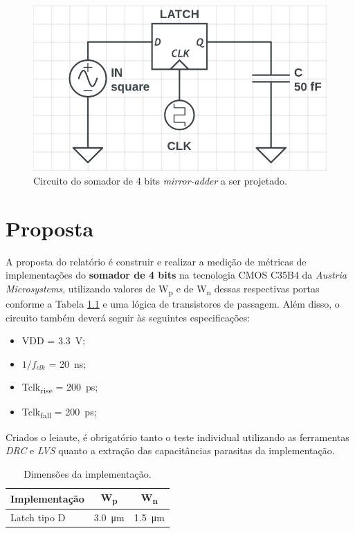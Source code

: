 \documentclass{iiufrgs}
\begin{document}
\begin{figure}[htb]
    \centering
    \caption{Circuito do somador de 4 bits \textit{mirror-adder} a ser projetado.}
    \label{fig:somador1bit}
    \includegraphics[scale=0.5]{images/schem_pretty.png}
\end{figure}

\chapter{Proposta}\label{proposta}
A proposta do relatório é construir e realizar a medição de métricas de implementações do \textbf{somador de 4 bits} na tecnologia CMOS C35B4 da \textit{Austria Microsystems}, utilizando valores de W\textsubscript{p} e de W\textsubscript{n} dessas respectivas portas conforme a Tabela \ref{tab:imp} e uma lógica de transistores de passagem.
Além disso, o circuito também deverá seguir às seguintes especificações:

\begin{itemize}[noitemsep]
    \setlength{\itemindent}{1em}
    \item VDD = \SI{3.3}{\V};
    \item $1/{f_{clk}}$ = \SI{20}{\ns};
    \item Tclk\textsubscript{rise} = \SI{200}{\ps};
    \item Tclk\textsubscript{fall} = \SI{200}{\ps};
\end{itemize}

Criados o leiaute, é obrigatório tanto o teste individual utilizando as ferramentas \textit{DRC} e \textit{LVS} quanto a extração das capacitâncias parasitas da implementação.

\begin{table}[ht]
    \centering
    \caption{Dimensões da implementação.}
    \label{tab:imp}
    \begin{tabular}{l c c}
        \hline
        Implementação
        & W\textsubscript{p}
        & W\textsubscript{n} \\ \hline
        Latch tipo D & \SI{3.0}{\um}    & \SI{1.5}{\um}     \\ \hline
    \end{tabular}
\end{table}
\end{document}
